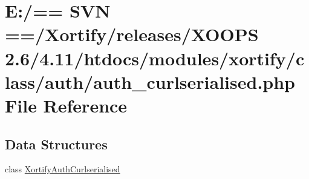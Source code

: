 \hypertarget{auth__curlserialised_8php}{\section{E\-:/== S\-V\-N ==/\-Xortify/releases/\-X\-O\-O\-P\-S 2.6/4.11/htdocs/modules/xortify/class/auth/auth\-\_\-curlserialised.php File Reference}
\label{auth__curlserialised_8php}
}
\subsection*{Data Structures}
\begin{DoxyCompactItemize}
\item 
class \hyperlink{class_xortify_auth_curlserialised}{Xortify\-Auth\-Curlserialised}
\end{DoxyCompactItemize}
